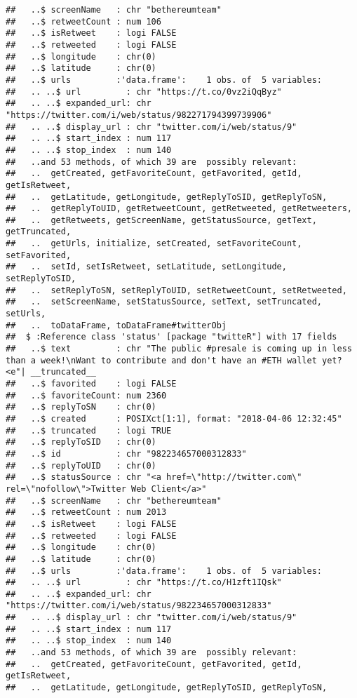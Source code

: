 \documentclass[]{article}
\begin{document}
\begin{verbatim}
##   ..$ screenName   : chr "bethereumteam"
##   ..$ retweetCount : num 106
##   ..$ isRetweet    : logi FALSE
##   ..$ retweeted    : logi FALSE
##   ..$ longitude    : chr(0) 
##   ..$ latitude     : chr(0) 
##   ..$ urls         :'data.frame':    1 obs. of  5 variables:
##   .. ..$ url         : chr "https://t.co/0vz2iQqByz"
##   .. ..$ expanded_url: chr "https://twitter.com/i/web/status/982271794399739906"
##   .. ..$ display_url : chr "twitter.com/i/web/status/9"
##   .. ..$ start_index : num 117
##   .. ..$ stop_index  : num 140
##   ..and 53 methods, of which 39 are  possibly relevant:
##   ..  getCreated, getFavoriteCount, getFavorited, getId, getIsRetweet,
##   ..  getLatitude, getLongitude, getReplyToSID, getReplyToSN,
##   ..  getReplyToUID, getRetweetCount, getRetweeted, getRetweeters,
##   ..  getRetweets, getScreenName, getStatusSource, getText, getTruncated,
##   ..  getUrls, initialize, setCreated, setFavoriteCount, setFavorited,
##   ..  setId, setIsRetweet, setLatitude, setLongitude, setReplyToSID,
##   ..  setReplyToSN, setReplyToUID, setRetweetCount, setRetweeted,
##   ..  setScreenName, setStatusSource, setText, setTruncated, setUrls,
##   ..  toDataFrame, toDataFrame#twitterObj
##  $ :Reference class 'status' [package "twitteR"] with 17 fields
##   ..$ text         : chr "The public #presale is coming up in less than a week!\nWant to contribute and don't have an #ETH wallet yet? <e"| __truncated__
##   ..$ favorited    : logi FALSE
##   ..$ favoriteCount: num 2360
##   ..$ replyToSN    : chr(0) 
##   ..$ created      : POSIXct[1:1], format: "2018-04-06 12:32:45"
##   ..$ truncated    : logi TRUE
##   ..$ replyToSID   : chr(0) 
##   ..$ id           : chr "982234657000312833"
##   ..$ replyToUID   : chr(0) 
##   ..$ statusSource : chr "<a href=\"http://twitter.com\" rel=\"nofollow\">Twitter Web Client</a>"
##   ..$ screenName   : chr "bethereumteam"
##   ..$ retweetCount : num 2013
##   ..$ isRetweet    : logi FALSE
##   ..$ retweeted    : logi FALSE
##   ..$ longitude    : chr(0) 
##   ..$ latitude     : chr(0) 
##   ..$ urls         :'data.frame':    1 obs. of  5 variables:
##   .. ..$ url         : chr "https://t.co/H1zft1IQsk"
##   .. ..$ expanded_url: chr "https://twitter.com/i/web/status/982234657000312833"
##   .. ..$ display_url : chr "twitter.com/i/web/status/9"
##   .. ..$ start_index : num 117
##   .. ..$ stop_index  : num 140
##   ..and 53 methods, of which 39 are  possibly relevant:
##   ..  getCreated, getFavoriteCount, getFavorited, getId, getIsRetweet,
##   ..  getLatitude, getLongitude, getReplyToSID, getReplyToSN,

\end{verbatim}
\end{document}

